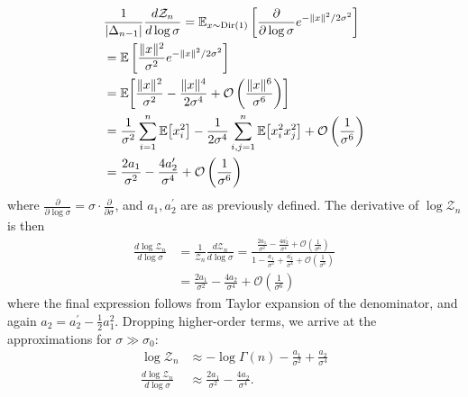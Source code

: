 \begin{align*}
     & \frac{1}{|\ProbSimplex{n-1}|} \frac{d \mathcal{Z}_n}{d \log\sigma}
    = \mathbb{E}_{\vv{x} \sim \Dir{1}} \left[ \frac{\partial}{\partial \log\sigma} e^{ -\lVert \vv{x} \rVert^2 / 2 \sigma^2 } \right]                                        \\
     & = \mathbb{E} \left[ \frac{\lVert \vv{x} \rVert^2}{\sigma^2} e^{ -\lVert \vv{x} \rVert^2 / 2 \sigma^2 } \right]                                                        \\
     & = \Ex{ \frac{\lVert \vv{x} \rVert^2}{\sigma^2} - \frac{\lVert \vv{x} \rVert^4}{2 \sigma^4} + \mathcal{O}\left( \frac{\lVert \vv{x} \rVert^6}{\sigma^6} \right) }      \\
     & = \frac{1}{\sigma^2} \sum_{i=1}^n \Ex{ \vv{x}_i^2 } - \frac{1}{2 \sigma^4} \sum_{i,j=1}^n \Ex{ \vv{x}_i^2 \vv{x}_j^2 } + \mathcal{O}\left( \frac{1}{\sigma^6} \right) \\
     & = \frac{2 a_1}{\sigma^2} - \frac{4 a_2^\prime}{\sigma^4} + \mathcal{O}\left( \frac{1}{\sigma^6} \right)
\end{align*}
where $\frac{\partial}{\partial \log\sigma} = \sigma \cdot \frac{\partial}{\partial \sigma}$, and $a_1, a_2^\prime$ are as previously defined.
The derivative of $\log\mathcal{Z}_n$ is then
\begin{align*}
    \frac{d \log\mathcal{Z}_n}{d \log\sigma} & = \frac{1}{\mathcal{Z}_n} \frac{d \mathcal{Z}_n}{d \log\sigma} = \frac{\frac{2 a_1}{\sigma^2} - \frac{4 a_2^\prime}{\sigma^4} + \mathcal{O}\left( \frac{1}{\sigma^6} \right)}{1 - \frac{a_1}{\sigma^2} + \frac{a_2^\prime}{\sigma^4} + \mathcal{O}\left( \frac{1}{\sigma^6} \right)} \\
                                             & = \frac{2 a_1}{\sigma^2} - \frac{4 a_2}{\sigma^4} + \mathcal{O}\left( \frac{1}{\sigma^6} \right)
\end{align*}
where the final expression follows from Taylor expansion of the denominator, and again $a_2 = a_2^\prime - \frac{1}{2} a_1^2$.
Dropping higher-order terms, we arrive at the approximations for $\sigma \gg \sigma_0$:
\begin{align}
    \log\mathcal{Z}_n                        & \approx -\log\Gamma(n) - \frac{a_1}{\sigma^2} + \frac{a_2}{\sigma^4} \label{eqn:supp:gauss_norm_large_sigma} \\
    \frac{d \log\mathcal{Z}_n}{d \log\sigma} & \approx \frac{2 a_1}{\sigma^2} - \frac{4 a_2}{\sigma^4}. \label{eqn:supp:gauss_norm_deriv_large_sigma}
\end{align}

